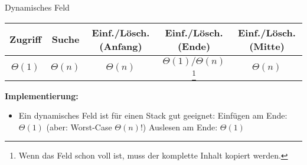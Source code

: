 \documentclass[german]{../spicker}
\begin{document}
\begin{defi}{Dynamisches Feld}
    \begin{center}
        \begin{tabular}{c|c|c|c|c}
            Zugriff     & Suche       & Einf./Lösch. (Anfang) & Einf./Lösch. (Ende)                                                                                     & Einf./Lösch. (Mitte) \\
            \hline
            $\Theta(1)$ & $\Theta(n)$ & $\Theta(n)$           & $\Theta(1)/\Theta(n)$\footnote{Wenn das Feld schon voll ist, muss der komplette Inhalt kopiert werden.} & $\Theta(n)$          \\
        \end{tabular}
    \end{center}

    \textbf{Implementierung:}
    \begin{itemize}
        \item Ein dynamisches Feld ist für einen Stack gut geeignet:
              \subitem Einfügen am Ende: $\Theta(1)$ (aber: Worst-Case $\Theta(n)$!)
              \subitem Auslesen am Ende: $\Theta(1)$
    \end{itemize}
\end{defi}
\end{document}
